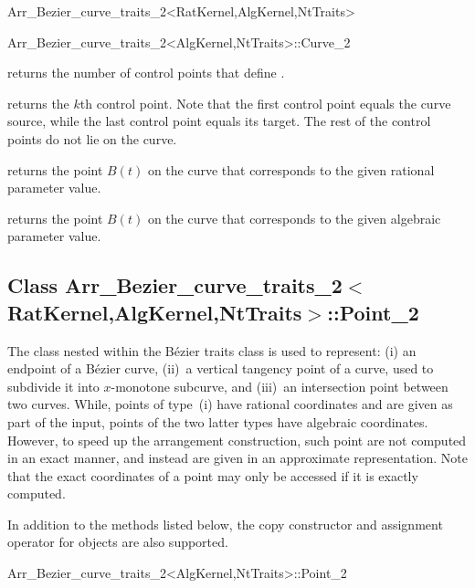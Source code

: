 \begin{ccRefClass}{Arr_Bezier_curve_traits_2<RatKernel,AlgKernel,NtTraits>}
\begin{ccClass}{Arr_Bezier_curve_traits_2<AlgKernel,NtTraits>::Curve_2}
\ccAccessFunctions

  {returns the number of control points that define \ccVar.}

  {returns the $k$th control point. Note that the first control point equals
   the curve source, while the last control point equals its target. The rest
   of the control points do not lie on the curve.
   }

  {returns the point $B(t)$ on the curve that corresponds to the given
   rational parameter value.}

  {returns the point $B(t)$ on the curve that corresponds to the given
   algebraic parameter value.}

\end{ccClass}


\subsection*{Class
         Arr\_Bezier\_curve\_traits\_2$<$RatKernel,AlgKernel,NtTraits$>$::Point\_2}

The  class nested within the B\'ezier traits class is used
to represent: (i) an endpoint of a B\'ezier curve, (ii)~a vertical tangency
point of a curve, used to subdivide it into $x$-monotone subcurve, and
(iii)~an intersection point between two curves. While, points of type~(i) have
rational coordinates and are given as part of the input, points of the two
latter types have algebraic coordinates. However, to speed up the arrangement
construction, such point are not computed in an exact manner, and instead
are given in an approximate representation. Note that the exact coordinates
of a point may only be accessed if it is exactly computed.

In addition to the methods listed below, the copy constructor and assignment
operator for  objects are also supported.

\begin{ccClass}{Arr_Bezier_curve_traits_2<AlgKernel,NtTraits>::Point_2}


\end{ccClass}
\end{ccRefClass}
